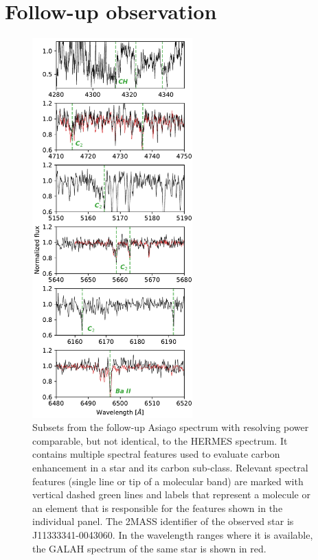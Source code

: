 \section{Follow-up observation}
\label{sec:asiago_cemp}

\begin{figure}
	\centering
	\includegraphics[width=0.55\textwidth]{asiago_cemp2.pdf}
	\caption{Subsets from the follow-up Asiago spectrum with resolving power comparable, but not identical, to the HERMES spectrum. It contains multiple spectral features used to evaluate carbon enhancement in a star and its carbon sub-class. Relevant spectral features (single line or tip of a molecular band) are marked with vertical dashed green lines and labels that represent a molecule or an element that is responsible for the features shown in the individual panel. The 2MASS identifier of the observed star is J11333341-0043060. In the wavelength ranges where it is available, the GALAH spectrum of the same star is shown in red.}
	\label{fig:asiago}
\end{figure}

